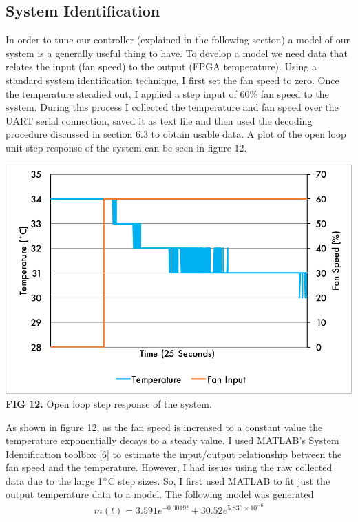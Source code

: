 \documentclass{article}
\begin{document}
\subsection{System Identification}
In order to tune our controller (explained in the following section) a model of our system is a generally useful thing to have. To develop a model we need data that relates the input (fan speed) to the output (FPGA temperature). Using a standard system identification technique, I first set the fan speed to zero. Once the temperature steadied out, I applied a step input of 60\% fan speed to the system. During this process I collected the temperature and fan speed over the UART serial connection, saved it as text file and then used the decoding procedure discussed in section 6.3 to obtain usable data. A plot of the open loop unit step response of the system can be seen in figure 12.
\begin{center}
\includegraphics[scale=.75]{images/open_loop}\\
\textbf{FIG 12.} Open loop step response of the system.\\
\end
{center}
As shown in figure 12, as the fan speed is increased to a constant value the temperature exponentially decays to a steady value. I used MATLAB's System Identification toolbox [6] to estimate the input/output relationship between the fan speed and the temperature. However, I had issues using the raw collected data due to the large 1$\degree$C step sizes. So, I first used MATLAB to fit just the output temperature data to a model. The following model was generated
\begin{align*}
m(t) = 3.591e^{-0.0019t}+30.52e^{5.836\times10^{-6}}
\end{align*}
\end{document}
